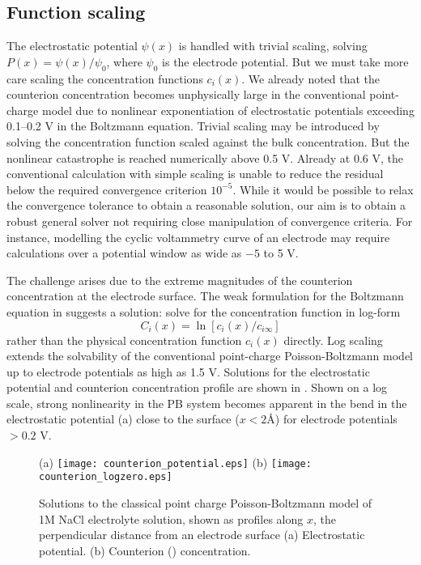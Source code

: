 \subsection{Function scaling}
The electrostatic potential $\psi(x)$ is handled with trivial
scaling, solving $P(x)=\psi(x)/\psi_0$, where $\psi_0$ is the
electrode potential.
But we must take more care scaling the concentration functions
$c_i(x)$.
We already noted that the counterion concentration becomes unphysically
large in the conventional point-charge model due to nonlinear
exponentiation of  electrostatic potentials exceeding 0.1--0.2 V in
the Boltzmann equation. Trivial scaling may be introduced by solving
the concentration function scaled against the bulk concentration. But
 the nonlinear catastrophe is reached
numerically above 0.5 V. Already at 0.6 V, the conventional
calculation with simple scaling is unable to reduce the residual below
the required convergence criterion  $10^{-5}$. While it would be possible to relax the
convergence tolerance to obtain a reasonable solution, our aim is to
obtain a robust general solver not requiring close manipulation of
convergence criteria. For instance,  modelling the
cyclic voltammetry curve of an electrode may require calculations
over a potential window as wide as $-5$ to 5 V.

The challenge arises due to the extreme magnitudes of the counterion
concentration at the electrode surface. The weak formulation for the
Boltzmann equation in  suggests a solution:
solve for the concentration function in log-form
\begin{equation}
C_{i}(x) = \ln[ c_{i}(x) / c_{i\infty}]
\label{log_scaling}
\end{equation}
rather than the physical concentration function $c_{i}(x)$ directly. Log
scaling extends the solvability of the conventional point-charge Poisson-Boltzmann
model up to electrode potentials as high as 1.5 V. Solutions for the
electrostatic potential and counterion concentration profile are shown
in . Shown on a log scale, strong
nonlinearity in the PB system becomes apparent in the bend in the
electrostatic potential (a) close to the
surface ($x<2$\AA) for electrode potentials $> 0.2$ V.

\begin{figure}
\centering
(a)
\texttt{[image: counterion\_potential.eps]}
(b)
\texttt{[image: counterion\_logzero.eps]}
\caption{\label{fig_classical_PB}Solutions to the classical point
  charge Poisson-Boltzmann model of 1M NaCl electrolyte solution,
  shown as profiles along $x$, the perpendicular distance from an
  electrode surface (a) Electrostatic potential. (b) Counterion
  () concentration. }
\end{figure}

